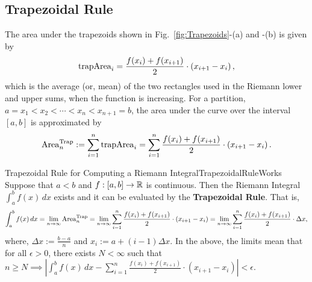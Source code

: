 \subsection{Trapezoidal Rule}

The area under the trapezoids shown in Fig.~\ref{fig:Trapezoids}-(a) and -(b) is given by 
\begin{equation}
    {\rm  trapArea}_i =  \frac{f(x_i) + f(x_{i+1})}{2} \cdot \left(x_{i+1} -x_i\right),
\end{equation}
which is the average (or, mean) of the two rectangles used in the Riemann lower and upper sums, when the function is increasing. For a partition, $a=x_1 < x_2 < \cdots <x_{n} < x_{n+1}=b$, the area under the curve over the interval $[a, b]$ is approximated by 
\begin{equation}
    {\rm Area}^{\rm Trap}_n:= \sum_{i=1}^n  {\rm  trapArea}_i =  \sum_{i=1}^n \frac{f(x_i) + f(x_{i+1})}{2} \cdot \left(x_{i+1} -x_i\right).
\end{equation}

\newpage

\begin{propColor}{Trapezoidal Rule for Computing a Riemann Integral}{TrapezoidalRuleWorks}
 Suppose that $a < b$ and $f:[a, b] \to \mathbb R$ is continuous. Then the Riemann Integral $\int_{a}^{b} f(x)\, dx$ exists and it can be evaluated by the \textbf{Trapezoidal Rule}. That is, 
\begin{equation}
\label{eq:TrapezoidalApproxForIntegration}
    \int_{a}^{b} f(x)\, dx = \lim_{n \to \infty}{\rm Area}^{\rm Trap}_n =   \lim_{n \to \infty}  \sum_{i=1}^n \frac{f(x_i) + f(x_{i+1})}{2} \cdot \left(x_{i+1} -x_i\right) = \lim_{n \to \infty}  \sum_{i=1}^n \frac{f(x_i) + f(x_{i+1})}{2} \cdot \Delta x,
\end{equation} 
where, $\Delta x:=\frac{b-a}{n}$ and $x_i:=a + (i-1) \Delta x$. In the above, the limits mean that for all $\epsilon>0$, there exists $N < \infty$ such that $n \ge N \implies \left| \int_{a}^{b} f(x)\, dx - \sum_{i=1}^n \frac{f(x_i) + f(x_{i+1})}{2} \cdot \left(x_{i+1} -x_i\right) \right| < \epsilon$.
\end{propColor}

